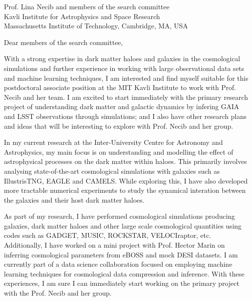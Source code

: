 \documentclass[11pt]{letter}
\begin{document}


\begin{letter}{Prof. Lina Necib and members of the search committee \\ Kavli Institute for Astrophysics and Space Research \\ Massachusetts Institute of Technology, Cambridge, MA, USA}

\opening{Dear members of the search committee,}


With a strong expertise in dark matter haloes and galaxies in the cosmological simulations and further experience in working with large observational data sets and machine learning techniques, I am interested and find myself suitable for this postdoctoral associate position at the MIT Kavli Institute to work with Prof. Necib and her team. I am excited to start immediately with the primary research project of understanding dark matter and galactic dynamics by infering GAIA and LSST observations through simulations; and I also have other research plans and ideas that will be interesting to explore with Prof. Necib and her group.

In my current research at the Inter-University Centre for Astronomy and Astrophysics, my main focus is on understanding and modelling the effect of astrophysical processes on the dark matter within haloes. This primarily involves analysing state-of-the-art cosmological simulations with galaxies such as IllustrisTNG, EAGLE and CAMELS. While exploring this, I have also developed more tractable numerical experiments to study the synamical interation between the galaxies and their host dark matter haloes. 

As part of my research, I have performed cosmological simulations producing galaxies, dark matter haloes and other large scale cosmological quantities using codes such as GADGET, MUSIC, ROCKSTAR, VELOCIraptor, etc. Additionally, I have worked on a mini project with Prof. Hector Marin on inferring cosmological parameters from eBOSS and mock DESI datasets. I am currently part of a data science collaboration focused on employing machine learning techniques for cosmological data compression and inference. With these experiences, I am sure I can immediately start working on the primary project with the Prof. Necib and her group.


\end{letter}
\end{document}
